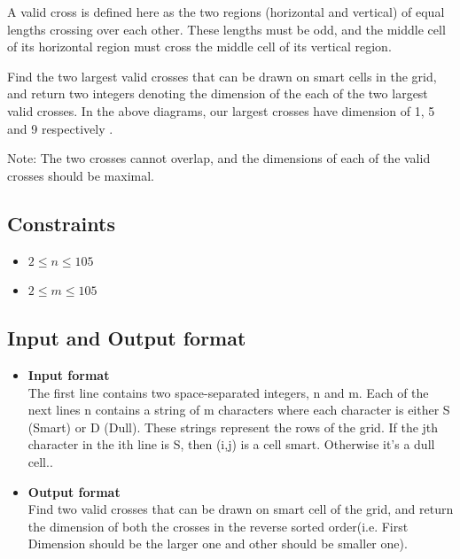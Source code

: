 \documentclass[a4paper,12pt]{article}
\begin{document}
A valid cross is defined here as the two regions (horizontal and vertical) of equal lengths crossing over each other. These lengths must be odd, and the middle cell of its horizontal region must cross the middle cell of its vertical region.

Find the two largest valid crosses that can be drawn on smart cells in the grid, and return two integers denoting the dimension of the each of the two largest valid crosses. In the above diagrams, our largest crosses have dimension of 1,  5 and 9 respectively .

Note: The two crosses cannot overlap, and the dimensions of each of the valid crosses should be maximal.



\subsection*{Constraints}
\begin{itemize}
\item $2 \leqslant n \leqslant 105$
\item $2 \leqslant m \leqslant 105$

\end{itemize}


\subsection{Input and Output format}
\begin{itemize}
\item \textbf{Input format} \\
The first line contains two space-separated integers,  n and m. 
Each of the next  lines n contains a string of  m characters where each character is either S (Smart) or D (Dull). These strings represent the rows of the grid. If the jth character in the ith  line is S, then  (i,j) is a  cell smart. Otherwise it's a  dull cell..
\item \textbf{Output format}\\
Find two valid crosses that can be drawn on smart cell of the grid, and return the dimension of both the crosses in the reverse sorted order(i.e. First Dimension should be the larger one and other should be smaller one).\\
\end{itemize}
\end{document}

